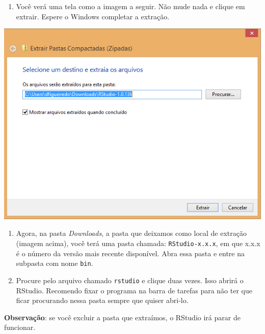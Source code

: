 \documentclass[
]{book}
\providecommand{\tightlist}{%
  \setlength{\itemsep}{0pt}\setlength{\parskip}{0pt}}
\begin{document}
\begin{enumerate}
\def\labelenumi{\arabic{enumi}.}
\setcounter{enumi}{3}
\tightlist
\item
  Você verá uma tela como a imagem a seguir. Não mude nada e clique em extrair. Espere o Windows completar a extração.
\end{enumerate}

\begin{center}\includegraphics[width=8.71in]{img/instalacao/extrair-tudo-rstudio} \end{center}

\begin{enumerate}
\def\labelenumi{\arabic{enumi}.}
\setcounter{enumi}{4}
\item
  Agora, na pasta \emph{Downloads}, a pasta que deixamos como local de extração (imagem acima), você terá uma pasta chamada: \texttt{RStudio-x.x.x}, em que x.x.x é o número da versão mais recente disponível. Abra essa pasta e entre na subpasta com nome \texttt{bin}.
\item
  Procure pelo arquivo chamado \texttt{rstudio} e clique duas vezes. Isso abrirá o RStudio. Recomendo fixar o programa na barra de tarefas para não ter que ficar procurando nessa pasta sempre que quiser abri-lo.
\end{enumerate}

\textbf{Observação}: se você excluir a pasta que extraímos, o RStudio irá parar de funcionar.
\end{document}
